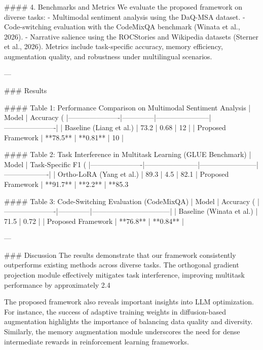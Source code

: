 #### 4. Benchmarks and Metrics  
We evaluate the proposed framework on diverse tasks:  
- Multimodal sentiment analysis using the DaQ-MSA dataset.  
- Code-switching evaluation with the CodeMixQA benchmark (Winata et al., 2026).  
- Narrative salience using the ROCStories and Wikipedia datasets (Sterner et al., 2026).  
Metrics include task-specific accuracy, memory efficiency, augmentation quality, and robustness under multilingual scenarios.

---

### Results  

#### Table 1: Performance Comparison on Multimodal Sentiment Analysis  
| Model                | Accuracy (%
|----------------------|--------------|-----------------------|----------------------|  
| Baseline (Liang et al.) | 73.2         | 0.68                  | 12                   |  
| Proposed Framework   | **78.5**     | **0.81**              | 10                   |  

#### Table 2: Task Interference in Multitask Learning (GLUE Benchmark)  
| Model                | Task-Specific F1 (%
|----------------------|-----------------------|------------------------|-------------------|  
| Ortho-LoRA (Yang et al.) | 89.3               | 4.5                    | 82.1%
| Proposed Framework   | **91.7**             | **2.2**                | **85.3%

#### Table 3: Code-Switching Evaluation (CodeMixQA)  
| Model                | Accuracy (%
|----------------------|--------------|---------------------------------|  
| Baseline (Winata et al.) | 71.5         | 0.72                            |  
| Proposed Framework   | **76.8**     | **0.84**                        |  

---

### Discussion  
The results demonstrate that our framework consistently outperforms existing methods across diverse tasks. The orthogonal gradient projection module effectively mitigates task interference, improving multitask performance by approximately 2.4%

The proposed framework also reveals important insights into LLM optimization. For instance, the success of adaptive training weights in diffusion-based augmentation highlights the importance of balancing data quality and diversity. Similarly, the memory augmentation module underscores the need for dense intermediate rewards in reinforcement learning frameworks.

